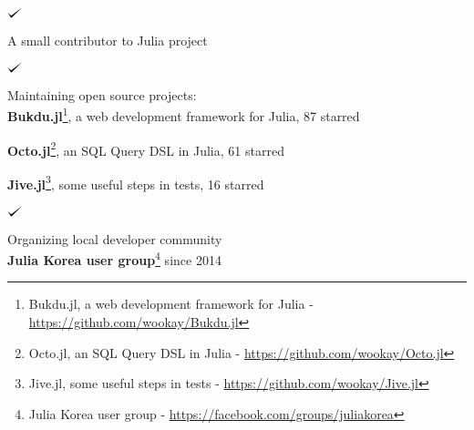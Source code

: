\documentclass[margin,line]{res}
\def\checkmark{\tikz\fill[scale=0.4](0,.35) -- (.25,0) -- (1,.7) -- (.25,.15) -- cycle;}
\newenvironment{list1}{
  \begin{list}{$\checkmark$}{
      \setlength{\parsep}{0in} \setlength{\parskip}{0.3cm}
      \setlength{\topsep}{0in} \setlength{\partopsep}{0.3cm}
      \setlength{\leftmargin}{0.2in}}}{\end{list}}
\begin{document}
\begin{resume}
\begin{list1}
\item A small contributor to Julia project
\end{list1}

\begin{list1}
\item Maintaining open source projects: \\
  {\bf Bukdu.jl}\footnote{ Bukdu.jl, a web development framework for Julia - \url{https://github.com/wookay/Bukdu.jl}}, a web development framework for Julia, 87 starred \hfill

  {\bf Octo.jl}\footnote{ Octo.jl, an SQL Query DSL in Julia - \url{https://github.com/wookay/Octo.jl}}, an SQL Query DSL in Julia, 61 starred \hfill

  {\bf Jive.jl}\footnote{ Jive.jl, some useful steps in tests - \url{https://github.com/wookay/Jive.jl}}, some useful steps in tests, 16 starred \hfill
\end{list1}

\begin{list1}
\item Organizing local developer community \\
  {\bf Julia Korea user group}\footnote{ Julia Korea user group - \url{https://facebook.com/groups/juliakorea}} since 2014
\end{list1}

\end{resume}
\end{document}
